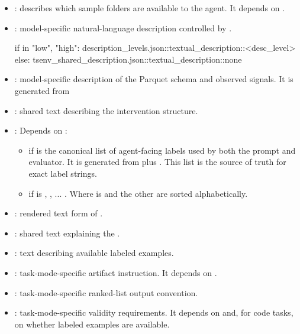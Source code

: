 \documentclass[11pt]{article}
\begin{document}
\begin{itemize}
\item {}: describes which sample folders are available to the agent. It depends on .
\item {}: model-specific natural-language description controlled by .
\begin{DocCode}
if \termDescLevel in {"low", "high"}:
  description_levels.json::textual_description::<desc_level>
else:
  tsenv_shared_description.json::textual_description::none
\end{DocCode}
\item {}: model-specific description of the Parquet schema and observed signals. 
It is generated from 
\item {}: shared text describing the intervention structure.
\item {}: Depends on :
\begin{itemize}
  \item if  is the canonical list of agent-facing labels used by both the prompt and evaluator. 
    It is generated from  plus \termNoParameterChangeClass. This list is the source of truth for exact label strings.
  \item if  is , ,  ... . 
  Where  is \termNoParameterChangeClass and the other are sorted alphabetically.
\end{itemize}
\item {}: rendered text form of .
\item {}: shared text explaining the \termNoParameterChangeClass.
\item {}: text describing available labeled examples. 
\item {}: task-mode-specific artifact instruction. It depends on .
\item {}: task-mode-specific ranked-list output convention.
\item {}: task-mode-specific validity requirements. It depends on  and, for code tasks, on whether labeled examples are available.

\end{itemize}
\end{document}
